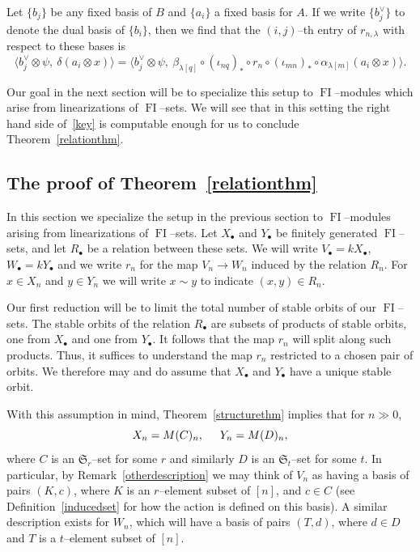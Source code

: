 \documentclass[ALCO,ThmDefs,Unicode,epreuves]{cedram}
\DeclareMathOperator{\FI}{FI}
\newcommand{\Sn}{\mathfrak{S}}
\newcommand{\dt}{\bullet}
\begin{document}
Let $\{b_j\}$ be any fixed basis of $B$ and $\{a_i\}$ a fixed basis for $A$. If we write $\{b_j^{\vee}\}$ to denote the dual basis of $\{b_i\}$, then we find that the $(i,j)$--th entry of $r_{n,\lambda}$ with respect to these bases is
\begin{equation}
\langle b_j^\vee \otimes \psi,\ \delta(a_i \otimes x) \rangle= \langle b_j^\vee \otimes \psi,\ \beta_{\lambda[q]} \circ (\iota_{nq})_\ast \circ r_n \circ (\iota_{mn})_\ast \circ \alpha_{\lambda[m]}(a_i \otimes x) \rangle. \label{key2}
\end{equation}

Our goal in the next section will be to specialize this setup to $\FI$--modules which arise from linearizations of $\FI$--sets. We will see that in this setting the right hand side of~\eqref{key} is computable enough for us to conclude Theorem~\ref{relationthm}.

\subsection{The proof of Theorem~\ref{relationthm}}\label{relproof2}

In this section we specialize the setup in the previous section to $\FI$--modules arising from linearizations of $\FI$--sets. Let $X_\dt$ and $Y_\dt$ be finitely generated $\FI$--sets, and let $R_\dt$ be a relation between these sets. We will write $V_\dt = k X_\dt$, $W_\dt = k Y_\dt$ and we write $r_n$ for the map $V_n \to W_n$ induced by the relation $R_n$. For $x \in X_n$ and $y \in Y_n$ we will write $x \sim y$ to indicate $(x,y) \in R_n$.

Our first reduction will be to limit the total number of stable orbits of our $\FI$--sets. The stable orbits of the relation $R_\dt$ are subsets of products of stable orbits, one from $X_\dt$ and one from $Y_\dt$. It follows that the map $r_n$ will split along such products. Thus, it suffices to understand the map $r_n$ restricted to a chosen pair of orbits. We therefore may and do assume that $X_\dt$ and $Y_\dt$ have a unique stable orbit.

With this assumption in mind, Theorem~\ref{structurethm} implies that for $n \gg 0$,
\[
X_n = M(C)_n, \hspace{.5cm} Y_n = M(D)_n,
\]
where $C$ is an $\Sn_r$--set for some $r$ and similarly $D$ is an $\Sn_t$--set for some $t$.
 In particular, by Remark~\ref{otherdescription} we may think of $V_n$ as having a basis of pairs $(K,c)$, where $K$ is an $r$--element subset of $[n]$, and $c \in C$ (see Definition~\ref{inducedset} for how the action is defined on this basis). A similar description exists for $W_n$, which will have a basis of pairs $(T,d)$, where $d \in D$ and $T$ is a $t$--element subset of $[n]$.
\end{document}
